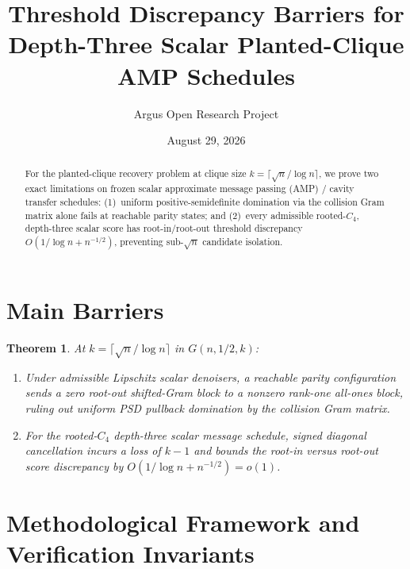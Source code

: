 \documentclass[10pt,reqno]{amsart}
\title[Threshold Discrepancy Barriers for Depth-Three Planted-Clique AMP Schedules]
{Threshold Discrepancy Barriers for Depth-Three Scalar Planted-Clique AMP Schedules}
\author{Argus Open Research Project}
\date{August 29, 2026}
\newtheorem{theorem}{Theorem}[section]
\theoremstyle{definition}
\begin{document}
\begin{abstract}
For the planted-clique recovery problem at clique size $k=\lceil\sqrt{n}/\log n\rceil$, we prove two exact limitations on frozen scalar approximate message passing (AMP) / cavity transfer schedules: (1)~uniform positive-semidefinite domination via the collision Gram matrix alone fails at reachable parity states; and (2)~every admissible rooted-$C_4$, depth-three scalar score has root-in/root-out threshold discrepancy $O(1/\log n + n^{-1/2})$, preventing sub-$\sqrt{n}$ candidate isolation.
\end{abstract}
\maketitle
\section{Main Barriers}
\begin{theorem}
At $k=\lceil\sqrt{n}/\log n\rceil$ in $G(n,1/2,k)$:
\begin{enumerate}[label=\textup{(\arabic*)}]
  \item Under admissible Lipschitz scalar denoisers, a reachable parity configuration sends a zero root-out shifted-Gram block to a nonzero rank-one all-ones block, ruling out uniform PSD pullback domination by the collision Gram matrix.
  \item For the rooted-$C_4$ depth-three scalar message schedule, signed diagonal cancellation incurs a loss of $k-1$ and bounds the root-in versus root-out score discrepancy by $O(1/\log n + n^{-1/2}) = o(1)$.
\end{enumerate}
\end{theorem}

\section{Methodological Framework and Verification Invariants}
\end{document}
